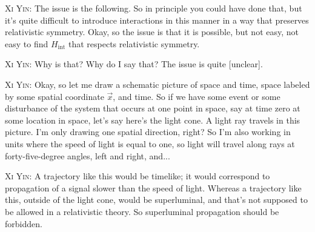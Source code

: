 \noindent\textsc{Xi Yin:} The issue is the following. So in principle you could have done that, but it's quite difficult to introduce interactions in this manner in a way that preserves relativistic symmetry. Okay, so the issue is that it is possible, but not easy, not easy to find $H_{\mathrm{int}}$ that respects relativistic symmetry.\par

\noindent\textsc{Xi Yin:} Why is that? Why do I say that? The issue is quite [unclear].\par


\noindent\textsc{Xi Yin:} Okay, so let me draw a schematic picture of space and time, space labeled by some spatial coordinate $\vec x$, and time. So if we have some event or some disturbance of the system that occurs at one point in space, say at time zero at some location in space, let's say here's the light cone. A light ray travels in this picture. I'm only drawing one spatial direction, right? So I'm also working in units where the speed of light is equal to one, so light will travel along rays at forty-five-degree angles, left and right, and...\par

\noindent\textsc{Xi Yin:} A trajectory like this would be timelike; it would correspond to propagation of a signal slower than the speed of light. Whereas a trajectory like this, outside of the light cone, would be superluminal, and that's not supposed to be allowed in a relativistic theory. So superluminal propagation should be forbidden.\par

